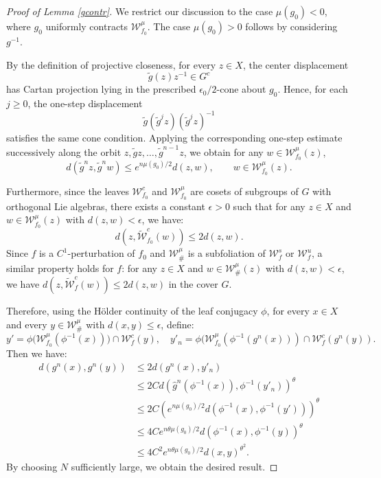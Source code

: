 \documentclass[11pt]{amsart}
\numberwithin{equation}{section}
\newcommand{\W}{\mathcal{W}}
\theoremstyle{plain}
\begin{document}
\begin{proof}[Proof of Lemma \ref{gcontr}]


    We restrict our discussion to the case $\mu(g_0) < 0$, where $g_0$ uniformly contracts $\W^\mu_{f_0}$. The case $\mu(g_0) > 0$ follows by considering $g^{-1}$.

By the definition of projective closeness, for every \(z\in X\), the
center displacement
\[
\tilde g(z)z^{-1}\in G^c
\]
has Cartan projection lying in the prescribed \(\epsilon_0/2\)-cone about
\(g_0\). Hence, for each \(j\ge0\), the one-step displacement
\[
\tilde g(\tilde g^j z)(\tilde g^j z)^{-1}
\]
satisfies the same cone condition. Applying the corresponding one-step
estimate successively along the orbit \(z,\tilde g z,\ldots,\tilde g^{n-1}z\),
we obtain for any $w \in \W^\mu_{f_0}(z)$,
\[
d(\tilde g^n z,\tilde g^n w)
   \le e^{n\mu(g_0)/2}d(z,w),
\qquad w\in \W^\mu_{f_0}(z).
\]

    Furthermore, since the leaves $\W^c_{f_0}$ and $\W^\mu_{f_0}$ are cosets of subgroups of $G$ with orthogonal Lie algebras, there exists a constant $\epsilon > 0$ such that for any $z \in X$ and $w \in \W^\mu_{f_0}(z)$ with $d(z,w) < \epsilon$, we have:
    \[
    d(z, \tilde{\W}^c_{f_0}(w)) \le 2d(z,w).
    \]
    Since $f$ is a $C^1$-perturbation of $f_0$ and $\W^\mu_\#$ is a subfoliation of $\W^s_f$ or $\W^u_f$, a similar property holds for $f$: for any $z \in X$ and $w \in \W^\mu_\#(z)$ with $d(z,w) < \epsilon$, we have $d(z, \tilde{\W}^c_f(w)) \le 2d(z,w)$ in the cover $G$.

    Therefore, using the Hölder continuity of the leaf conjugacy $\phi$, for every $x \in X$ and every $y \in \W^\mu_\#$ with $d(x,y) \le \epsilon$, define:
    \[
    y' = \phi\big(\W^\mu_{f_0}(\phi^{-1}(x))\big) \cap \W^c_f(y), \quad y'_n = \phi(\W^\mu_{f_0}(\phi^{-1}(g^n(x))) \cap \W^c_f(g^n(y)).
    \]
    Then we have:
    \[
    \begin{aligned}
    d(g^n(x), g^n(y)) &\le 2 d(g^n(x), y'_n) \\
    &\le 2C d(\hat{g}^n(\phi^{-1}(x)), \phi^{-1}(y'_n))^\theta \\
    &\le 2C \left(e^{n\mu(g_0)/2} d(\phi^{-1}(x), \phi^{-1}(y'))\right)^\theta \\
    &\le 4C e^{n \theta \mu(g_0)/2} d(\phi^{-1}(x), \phi^{-1}(y))^\theta \\
    &\le 4C^2 e^{n \theta \mu(g_0)/2} d(x,y)^{\theta^2}.
    \end{aligned}
    \]
    By choosing $N$ sufficiently large, we obtain the desired result.
\end{proof}
\end{document}
